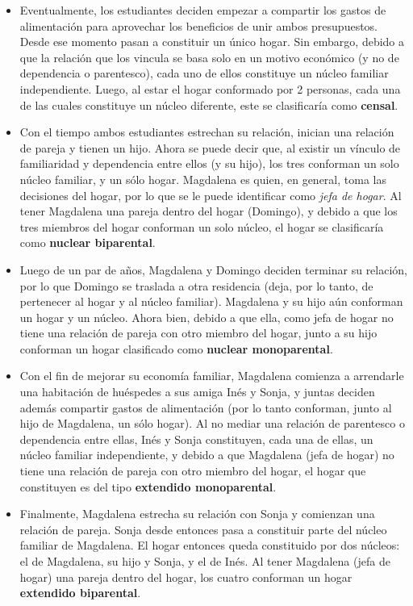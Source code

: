 \documentclass[12pt,letterpaper,spanish]{article}
\begin{document}
\begin{enumerate}
\begin{itemize}
    \item Eventualmente, los estudiantes deciden empezar a compartir los gastos de alimentación para aprovechar los beneficios de unir ambos presupuestos.  Desde ese momento pasan a constituir un único hogar. Sin embargo, debido a que la relación que los vincula se basa solo en un motivo económico (y no de dependencia o parentesco), cada uno de ellos constituye un núcleo familiar independiente. Luego, al estar el hogar conformado por 2 personas, cada una de las cuales constituye un núcleo diferente, este se clasificaría como \textbf{censal}.
    
    \item Con el tiempo ambos estudiantes estrechan su relación, inician una relación de pareja y tienen un hijo. Ahora se puede decir que, al existir un vínculo de familiaridad y dependencia entre ellos (y su hijo), los tres conforman un solo núcleo familiar, y un sólo hogar. Magdalena es quien, en general, toma las decisiones del hogar, por lo que se le puede identificar como \textit{jefa de hogar}. Al tener Magdalena una pareja dentro del hogar (Domingo), y debido a que los tres miembros del hogar conforman un solo núcleo, el hogar se clasificaría como \textbf{nuclear biparental}.
    
    \item Luego de un par de años, Magdalena y Domingo deciden terminar su relación, por lo que Domingo se traslada a otra residencia (deja, por lo tanto, de pertenecer al hogar y al núcleo familiar). Magdalena y su hijo aún conforman un hogar y un núcleo. Ahora bien, debido a que ella, como jefa de hogar no tiene una relación de pareja con otro miembro del hogar, junto a su hijo conforman un hogar clasificado como \textbf{nuclear monoparental}. 
    
    \item Con el fin de mejorar su economía familiar, Magdalena comienza a arrendarle una habitación de huéspedes a sus amiga Inés y Sonja, y juntas deciden además compartir gastos de alimentación (por lo tanto conforman, junto al hijo de Magdalena, un sólo hogar). Al no mediar una relación de parentesco o dependencia entre ellas, Inés y Sonja constituyen, cada una de ellas, un núcleo familiar independiente, y debido a que Magdalena (jefa de hogar) no tiene una relación de pareja con otro miembro del hogar, el hogar que constituyen es del tipo \textbf{extendido monoparental}.
    
    \item Finalmente, Magdalena estrecha su relación con Sonja y comienzan una relación de pareja. Sonja desde entonces pasa a constituir parte del núcleo familiar de Magdalena. El hogar entonces queda constituido por dos núcleos: el de Magdalena, su hijo y Sonja, y el de Inés. Al tener Magdalena (jefa de hogar) una pareja dentro del hogar, los cuatro conforman un hogar \textbf{extendido biparental}.
    

\end{itemize}
\end{enumerate}
\end{document}

